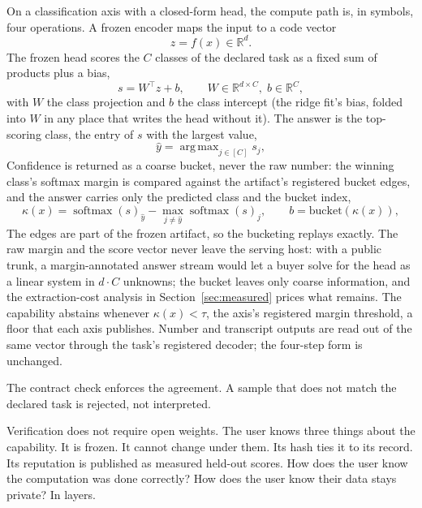 \documentclass[11pt]{article}
\DeclareMathOperator{\argmax}{arg\,max}
\DeclareMathOperator{\softmax}{softmax}
\begin{document}
On a classification axis with a closed-form head, the compute
path is, in symbols, four operations. A frozen encoder maps the
input to a code vector
\begin{equation}
    z = f(x) \in \mathbb{R}^d.
\end{equation}
The frozen head scores the $C$ classes of the declared task as a
fixed sum of products plus a bias,
\begin{equation}
    s = W^\top z + b, \qquad W \in \mathbb{R}^{d \times C},\;
    b \in \mathbb{R}^C,
\end{equation}
with $W$ the class projection and $b$ the class intercept (the
ridge fit's bias, folded into $W$ in any place that writes the
head without it). The answer is the
top-scoring class, the entry of $s$ with the largest value,
\begin{equation}
    \hat y = \argmax_{j \in [C]} s_j,
\end{equation}
Confidence is returned as a coarse bucket, never the raw
number: the winning class's softmax margin is compared against
the artifact's registered bucket edges, and the answer carries
only the predicted class and the bucket index,
\begin{equation}
    \kappa(x) = \softmax(s)_{\hat y} - \max_{j \neq \hat y} \softmax(s)_j, \qquad
    b = \text{bucket}(\kappa(x)),
\end{equation}
The edges are part of the frozen artifact, so the bucketing
replays exactly. The raw margin and the score vector never leave
the serving host: with a public trunk, a margin-annotated answer
stream would let a buyer solve for the head as a linear system
in $d \cdot C$ unknowns; the bucket leaves only coarse
information, and the extraction-cost analysis in
Section~\ref{sec:measured} prices what remains.
The capability abstains whenever $\kappa(x) < \tau$, the axis's
registered margin threshold, a floor that each axis publishes.
Number and transcript outputs are
read out of the same vector through the task's registered
decoder; the four-step form is unchanged.

The contract check enforces the agreement. A sample that does not
match the declared task is rejected, not interpreted.

Verification does not require open weights. The user knows three
things about the capability. It is frozen. It cannot change under
them. Its hash ties it to its record. Its reputation is published
as measured held-out scores. How does the user know the
computation was done correctly? How does the user know their data
stays private? In layers.
\end{document}
